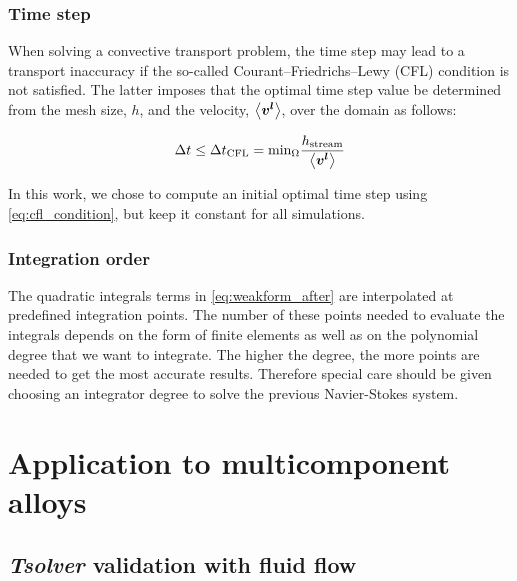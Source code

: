 \subsubsection{Time step}

When solving a convective transport problem, the time step may lead to a transport inaccuracy
if the so-called Courant–Friedrichs–Lewy (CFL) condition is not satisfied. The latter imposes that
the optimal time step value be determined from the mesh size, $h$, and the velocity, $\left \langle \boldsymbol{v^l} \right \rangle$, over the domain as follows:

\begin{align}
\label{eq:cfl_condition}
\Delta t \leq \Delta t_\text{CFL} = \text{min}_\Omega \frac{h_\text{stream}}{\left \langle \boldsymbol{v^l} \right \rangle}
\end{align}

In this work, we chose to compute an initial optimal time step using \cref{eq:cfl_condition}, but keep it
constant for all simulations.

\subsubsection{Integration order}

The quadratic integrals terms in \cref{eq:weakform_after} are interpolated at predefined integration points.
The number of these points needed to evaluate the integrals depends on the form of finite elements
as well as on the polynomial degree that we want to integrate. The higher the degree, the more points 
are needed to get the most accurate results. Therefore special care should be given choosing an integrator
degree to solve the previous Navier-Stokes system.


\section{Application to multicomponent alloys}

\subsection{\emph{Tsolver} validation with fluid flow}  \label{sec:tsolver_validation}

